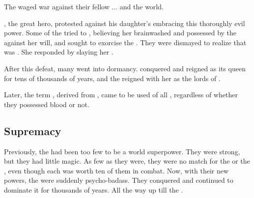 The \firstgendragons{} waged war against their fellow \ophidians{}... and the world.

\HesodNerga{}, the great \ophidian{} hero, protested against his daughter's embracing this thoroughly evil power. Some of the \ophidians{} tried to  \Tiamat, believing her brainwashed and possessed by the \xzaishanns{} against her will, and sought to exorcise the \daemons. They were dismayed to realize that \Tiamat{} was . 
She responded by slaying her \HesodNerga. 

After this defeat, many \ophidians{} went into dormancy. \Tiamat{} conquered \Miith{} and reigned as its queen for tens of thousands of years, and the \dragons{} reigned with her as the lords of \Miith{}. 

Later, the term \quo\dragon, derived from \quo\draecchonosh, came to be used of all \ophidians, regardless of whether they possessed \xzaishannic{} blood or not. 











\subsection{\Draconian{} Supremacy}
Previously, the \dragons{} had been too few to be a world superpower. 
They were strong, but they had little magic. 
As few as they were, they were no match for the \quiljaaran{} or the \aryothim, even though each \dragon{} was worth ten of them in combat. 
Now, with their new powers, the \dzraicchenosses{} were suddenly psycho-badass. 
They conquered{} \Miith{} and continued to dominate it for thousands of years. 
All the way up till the \secondbanewar. 





